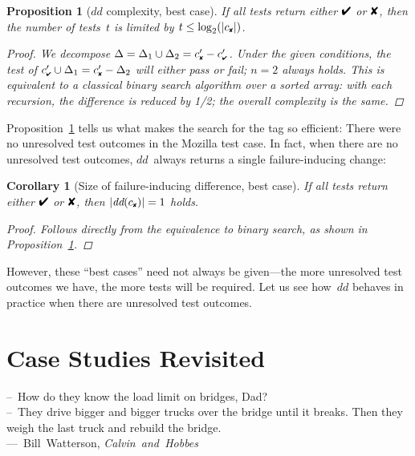 \documentclass{acm_proc_article-sp}
\newcommand{\PASS}{\text{\ding{52}}\xspace}
\newcommand{\FAIL}{\text{\ding{56}}\xspace}
\newcommand{\cfail}{{c_{\scriptscriptstyle \FAIL}}}
\newcommand{\dpass}{{c'_{\scriptscriptstyle \PASS}}}
\newcommand{\dfail}{{c'_{\scriptscriptstyle \FAIL}}}
\newcommand{\dd}{\textit{dd}\xspace}
\newcommand{\codeid}[1]{\text{\upshape\texttt{#1}}}
\def\<#1>{\codeid{#1}}
\newenvironment{Quote}{%
\smallskip
\begin{minipage}[t]{\columnwidth}
\begin{flushright}%
\itshape%
\samepage%
}{\end{flushright}\end{minipage}\par}
\newcommand{\By}[2]{\\[1mm]---~\mbox{\textnormal{#1}} \mbox{\textsl{#2}}}
\theoremstyle{plain}
\newtheorem{proposition}[definition]{Proposition}
\newtheorem{corollary}[definition]{Corollary}
\begin{document}
\begin{proposition}[$\dd$ complexity, best case]
\label{pro:dd-best-complexity}
If all tests return either $\PASS$ or $\FAIL$, then the number
of tests~$t$ is limited by $t \leq \log_2(|\cfail|)$.
\begin{proof}
  We decompose $\Delta = \Delta_1 \cup \Delta_2 = \dfail - \dpass$.  Under the given
  conditions, the test of $\dpass \cup \Delta_1 = \dfail - \Delta_2$ will either
  pass or fail; $n = 2$ always holds.  This is equivalent to a
  classical binary search algorithm over a sorted array: with each
  recursion, the difference is reduced by 1/2; the overall complexity
  is the same.
\end{proof}
\end{proposition}

Proposition~\ref{pro:dd-best-complexity} tells us what makes the
search for the \<SELECT> tag so efficient: There were no unresolved
test outcomes in the Mozilla test case.  In fact, when there are no
unresolved test outcomes, $\dd$~always returns a single
failure-inducing change:

\begin{corollary}[Size of failure-inducing difference, best case]
\label{cor:dd-size}
If all tests return either $\PASS$ or $\FAIL$, then $|\dd(\cfail)| =
1$ holds.
\begin{proof}
  Follows directly from the equivalence to binary search, as shown in
  Proposition~\ref{pro:dd-best-complexity}.
\end{proof}
\end{corollary}

However, these ``best cases'' need not always be given---the more
unresolved test outcomes we have, the more tests will be required.
Let us see how~$\dd$ behaves in practice when there are unresolved
test outcomes.


\section{Case Studies Revisited}
\label{sec:fuzz-revisited}

\begin{Quote}
--~How do they know the load limit on bridges, Dad? \\
--~They drive bigger and bigger trucks over the bridge 
   until it breaks. Then they weigh the last truck 
   and rebuild the bridge.
\By{Bill Watterson,}{Calvin and Hobbes}
\end{Quote}
\end{document}
